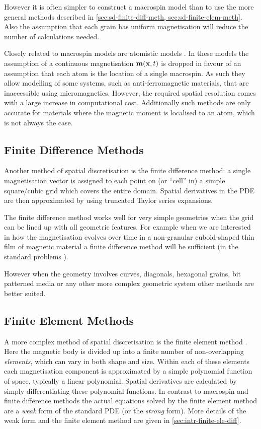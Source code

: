 However it is often simpler to construct a macrospin model than to use the more general methods described in \cref{sec:sd-finite-diff-meth, sec:sd-finite-elem-meth}.
Also the assumption that each grain has uniform magnetisation will reduce the number of calculations needed.

Closely related to macrospin models are atomistic models \cite{Evans2014}.
In these models the assumption of a continuous magnetisation $\boldsymbol{\mathrm{m}}(\boldsymbol{\mathrm{x}}, t)$ is dropped in favour of an assumption that each atom is the location of a single macrospin.
As such they allow modelling of some systems, such as anti-ferromagnetic materials, that are inaccessible using micromagnetics.
However, the required spatial resolution comes with a large increase in computational cost.
Additionally  such methods are only accurate for materials where the magnetic moment is localised to an atom, which is not always the case.


\subsection{Finite Difference Methods}
\label{sec:sd-finite-diff-meth}

Another method of spatial discretisation is the finite difference method: a single magnetisation vector is assigned to each point on (or ``cell'' in) a simple square/cubic grid which covers the entire domain.
Spatial derivatives in the PDE are then approximated by using truncated Taylor series expansions.

The finite difference method works well for very simple geometries when the grid can be lined up with all geometric features.
For example when we are interested in how the magnetisation evolves over time in a non-granular cuboid-shaped thin film of magnetic material a finite difference method will be sufficient (\eg in the \mumag standard problems \cite{mumag-website}).

However when the geometry involves curves, diagonals, hexagonal grains, bit patterned media or any other more complex geometric system other methods are better suited.


\subsection{Finite Element Methods}
\label{sec:sd-finite-elem-meth}

A more complex method of spatial discretisation is the finite element method \cite{HowardElmanDavidSilvester2006}.
Here the magnetic body is divided up into a finite number of non-overlapping \emph{elements}, which can vary in both shape and size.
Within each of these elements each magnetisation component is approximated by a simple polynomial function of space, typically a linear polynomial.
Spatial derivatives are calculated by simply differentiating these polynomial functions.
In contrast to macrospin and finite difference methods the actual equations solved by the finite element method are a \emph{weak} form of the standard PDE (or the \emph{strong} form).
More details of the weak form and the finite element method are given in \cref{sec:intr-finite-ele-diff}.

